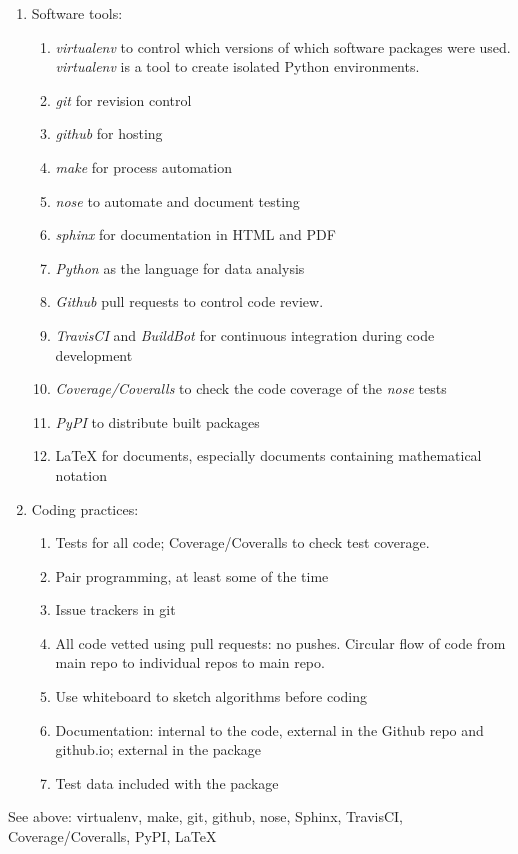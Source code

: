 \documentclass[]{article}
\begin{document}
  \begin{enumerate}
  \def\labelenumii{\roman{enumii}.}
  \itemsep1pt\parskip0pt
  \item
    Software tools:

    \begin{enumerate}
    \def\labelenumiii{\alph{enumiii}.}
    \itemsep1pt\parskip0pt
    \item
      \emph{virtualenv} to control which versions of which software
      packages were used. \emph{virtualenv} is a tool to create isolated
      Python environments.
    \item
      \emph{git} for revision control
    \item
      \emph{github} for hosting
    \item
      \emph{make} for process automation
    \item
      \emph{nose} to automate and document testing
    \item
      \emph{sphinx} for documentation in HTML and PDF
    \item
      \emph{Python} as the language for data analysis
    \item
      \emph{Github} pull requests to control code review.
    \item
      \emph{TravisCI} and \emph{BuildBot} for continuous integration
      during code development
    \item
      \emph{Coverage/Coveralls} to check the code coverage of the
      \emph{nose} tests
    \item
      \emph{PyPI} to distribute built packages
    \item
      LaTeX for documents, especially documents containing mathematical
      notation
    \end{enumerate}
  \item
    Coding practices:

    \begin{enumerate}
    \def\labelenumiii{\alph{enumiii}.}
    \itemsep1pt\parskip0pt
    \item
      Tests for all code; Coverage/Coveralls to check test coverage.
    \item
      Pair programming, at least some of the time
    \item
      Issue trackers in git
    \item
      All code vetted using pull requests: no pushes. Circular flow of
      code from main repo to individual repos to main repo.
    \item
      Use whiteboard to sketch algorithms before coding
    \item
      Documentation: internal to the code, external in the Github repo
      and github.io; external in the package
    \item
      Test data included with the package
    \end{enumerate}
  \end{enumerate}

See above: virtualenv,
make, git, github, nose, Sphinx, TravisCI, Coverage/Coveralls, PyPI,
LaTeX



\end{document}
